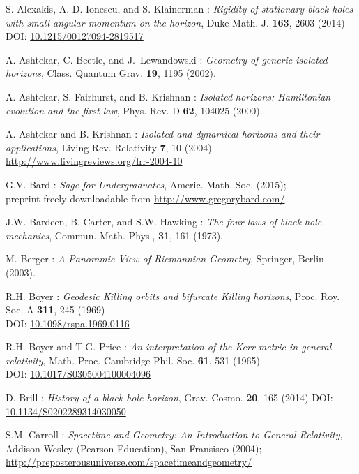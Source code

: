 \begin{thebibliography}{123}

S. Alexakis, A. D. Ionescu, and S. Klainerman : {\em Rigidity of stationary black holes with small angular momentum on the horizon},
Duke Math. J. {\bf 163}, 2603 (2014)\\
DOI: \href{http://dx.doi.org/10.1215/00127094-2819517}{10.1215/00127094-2819517}

A. Ashtekar, C. Beetle, and J.~Lewandowski : {\em Geometry of
generic isolated horizons},
Class. Quantum Grav. {\bf 19}, 1195 (2002).

A. Ashtekar, S. Fairhurst, and B. Krishnan : {\em Isolated horizons:
Hamiltonian evolution and the first law},
Phys. Rev. D {\bf 62}, 104025 (2000).

A. Ashtekar and B. Krishnan : {\em Isolated and dynamical horizons
and their applications},
Living Rev. Relativity {\bf 7}, 10 (2004) \\
\url{http://www.livingreviews.org/lrr-2004-10}

G.V. Bard : {\em Sage for Undergraduates}, Americ. Math. Soc. (2015); \\
preprint freely downloadable from \url{http://www.gregorybard.com/}

J.W. Bardeen, B. Carter, and S.W. Hawking : {\em The four laws of black
hole mechanics}, Commun. Math. Phys., {\bf 31}, 161 (1973).

M. Berger : {\em A Panoramic View of Riemannian Geometry},
Springer, Berlin (2003).

R.H. Boyer : {\em Geodesic Killing orbits and bifurcate Killing horizons},
Proc. Roy. Soc. A {\bf 311}, 245 (1969)\\
DOI: \href{http://dx.doi.org/10.1098/rspa.1969.0116}{10.1098/rspa.1969.0116}

R.H. Boyer and T.G. Price : {\em An interpretation of the Kerr metric in general relativity},
Math. Proc. Cambridge Phil. Soc. {\bf 61}, 531 (1965)\\
DOI: \href{http://dx.doi.org/10.1017/S0305004100004096}{10.1017/S0305004100004096}

D. Brill : {\em History of a black hole horizon},
Grav. Cosmo. {\bf 20}, 165 (2014)
DOI: \href{http://dx.doi.org/10.1134/S0202289314030050}{10.1134/S0202289314030050}

S.M. Carroll : \emph{Spacetime and Geometry: An Introduction to General Relativity},
Addison Wesley (Pearson Education), San Fransisco (2004); \\
\url{http://preposterousuniverse.com/spacetimeandgeometry/}


\end{thebibliography}
